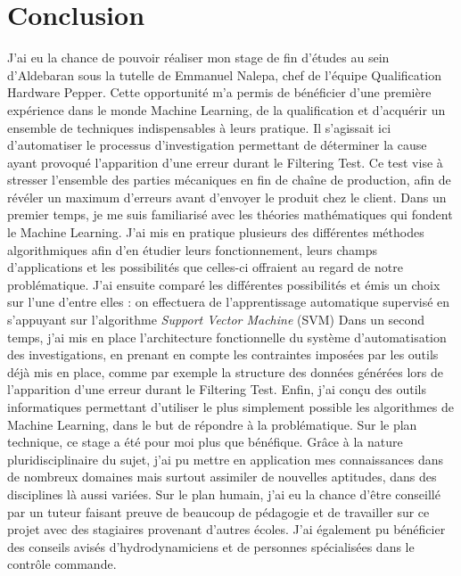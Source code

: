 \chapter{Conclusion}
\label{Conclusion}
\thispagestyle{fancy}

J'ai eu la chance de pouvoir réaliser mon stage de fin d'études au sein d'Aldebaran sous la tutelle de Emmanuel Nalepa, chef de l'équipe Qualification Hardware Pepper. Cette opportunité m'a permis de bénéficier d'une première expérience dans le monde Machine Learning, de la qualification et d'acquérir un ensemble de techniques indispensables à leurs pratique. Il s'agissait ici d'automatiser le processus d'investigation permettant de déterminer la cause ayant provoqué l'apparition d'une erreur durant le Filtering Test. Ce test vise à stresser l'ensemble des parties mécaniques en fin de chaîne de production, afin de révéler un maximum d'erreurs avant d'envoyer le produit chez le client.
\newline
\newline
Dans un premier temps, je me suis familiarisé avec les théories mathématiques qui fondent le Machine Learning. J'ai mis en pratique plusieurs des différentes méthodes algorithmiques afin d'en étudier leurs fonctionnement, leurs champs d'applications et les possibilités que celles-ci offraient au regard de notre problématique. J'ai ensuite comparé les différentes possibilités et émis un choix sur l'une d'entre elles : on effectuera de l'apprentissage automatique supervisé en s'appuyant sur l'algorithme \emph{Support Vector Machine} (SVM)
\newline
Dans un second temps, j'ai mis en place l'architecture fonctionnelle du système d'automatisation des investigations, en prenant en compte les contraintes imposées par les outils déjà mis en place, comme par exemple la structure des données générées lors de l'apparition d'une erreur durant le Filtering Test. 
\newline
Enfin, j'ai conçu des outils informatiques permettant d'utiliser le plus simplement possible les algorithmes de Machine Learning, dans le but de répondre à la problématique. 
\newline
\newline
Sur le plan technique, ce stage a été pour moi plus que bénéfique. Grâce à la nature pluridisciplinaire du sujet, j'ai pu mettre en application mes connaissances dans de nombreux domaines mais surtout assimiler de nouvelles aptitudes, dans des disciplines là aussi variées. Sur le plan humain, j'ai eu la chance d’être conseillé par un tuteur faisant preuve de beaucoup de pédagogie et de travailler sur ce projet avec des stagiaires provenant d'autres écoles. J'ai également pu bénéficier des conseils avisés d'hydrodynamiciens et de personnes spécialisées dans le contrôle commande.